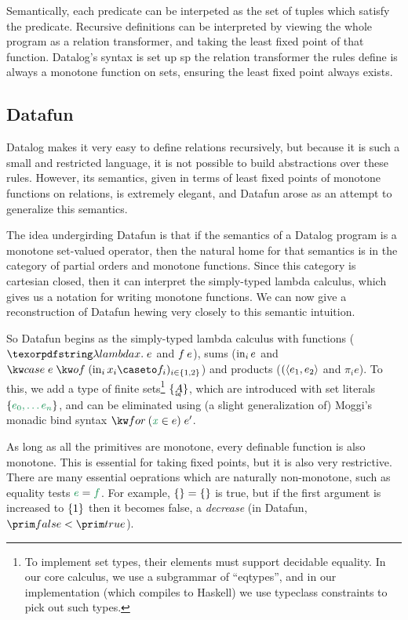 Semantically, each predicate can be interpeted as the set of tuples
which satisfy the predicate. Recursive definitions can be interpreted
by viewing the whole program as a relation transformer, and taking the
least fixed point of that function. Datalog's syntax is set up sp the
relation transformer the rules define is always a monotone function on
sets, ensuring the least fixed point always exists.

\subsection{Datafun}



Datalog makes it very easy to define relations recursively, but
because it is such a small and restricted language, it is not possible
to build abstractions over these rules. However, its semantics, given
in terms of least fixed points of monotone functions on relations,
is extremely elegant, and Datafun arose as an attempt to generalize
this semantics.

The idea undergirding Datafun is that if the semantics of a Datalog
program is a monotone set-valued operator, then the natural home for
that semantics is in the category \Poset{} of partial orders and
monotone functions. Since this category is cartesian closed, then it
can interpret the simply-typed lambda calculus, which gives us a
notation for writing monotone functions. We can now give a
reconstruction of Datafun hewing very closely to this semantic
intuition.

So Datafun begins as the simply-typed lambda calculus with functions
($\fnof{x}{e}$ and $f\<e$), sums ($\mathrm{in}_{i}\, e$ and $\ecase{e} (\inj i
x_i \caseto f_i)_{i\in\{1,2\}}$) and products ($(\langle{e_1, e_2}\rangle$
and $\pi_i e$). To this, we add a type of finite sets\footnote{To
  implement set types, their elements must support decidable equality.
  In our core calculus, we use a subgrammar of ``eqtypes'', and in our
  implementation (which compiles to Haskell) we use typeclass
  constraints to pick out such types.} $\tset{\eqt A}$, which are
introduced with set literals $\eset{e_0, \ldots e_n}$, and can be
eliminated using (a slight generalization of) Moggi's monadic bind
syntax $\efor{x}{e}{e'}$.

As long as all the primitives are monotone, every definable
function is also monotone. This is essential for taking
fixed points, but it is also very restrictive. There are many
essential oeprations which are naturally non-monotone, such as
equality tests $\eeq e f$. For example, $\eset{} = \eset{}$ is true,
but if the first argument is increased to $\{{1}\}$ then it
becomes false, a \emph{decrease} (in Datafun, $\efalse < \etrue$).


